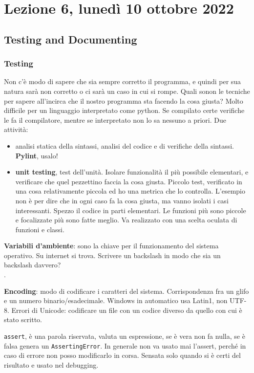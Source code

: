 \documentclass[10pt, a4paper, titlepage]{book}
\begin{document}
\section{Lezione 6, lunedì 10 ottobre 2022}

\subsection{Testing and Documenting}

\subsubsection{Testing}

Non c'è modo di sapere che sia sempre corretto il programma, e quindi per sua natura sarà non corretto o ci sarà un caso in cui si rompe.
Quali sonon le tecniche per sapere all'incirca che il nostro programma sta facendo la cosa giusta?
Molto difficile per un linguaggio interpretato come python. Se compilato certe verifiche le fa il compilatore, mentre se interpretato non lo sa nessuno a priori.
Due attività:
\begin{itemize}
	\item analisi statica della sintassi, analisi del codice e di verifiche della sintassi. \textbf{Pylint}, usalo!
	\item \textbf{unit testing}, test dell'unità. Isolare funzionalità il più possibile elementari, e verificare che quel pezzettino faccia la cosa giusta. Piccolo test, verificato in una cosa relativamente piccola ed ho una metrica che lo controlla. L'esempio non è per dire che in ogni caso fa la cosa giusta, ma vanno isolati i casi interessanti. Spezzo il codice in parti elementari. Le funzioni più sono piccole e focalizzate più sono fatte meglio. Va realizzato con una scelta oculata di funzioni e classi.
\end{itemize}

\textbf{Variabili d'ambiente}: sono la chiave per il funzionamento del sistema operativo. Su internet si trova. Scrivere un backslash in modo che sia un backslash davvero? \texttt{\\}.

\textbf{Encoding}: modo di codificare i caratteri del sistema. Corrispondenza fra un glifo e un numero binario/esadecimale. Windows in automatico usa Latin1, non UTF-8. Errori di Unicode: codificare un file con un codice diverso da quello con cui è stato scritto.

\texttt{assert}, è una parola riservata, valuta un espressione, se è vera non fa nulla, se è falsa genera un \texttt{AssertingError}. In generale non va usato mai l'assert, perché in caso di errore non posso modificarlo in corsa. Sensata solo quando si è certi del risultato e usato nel debugging.
\end{document}
